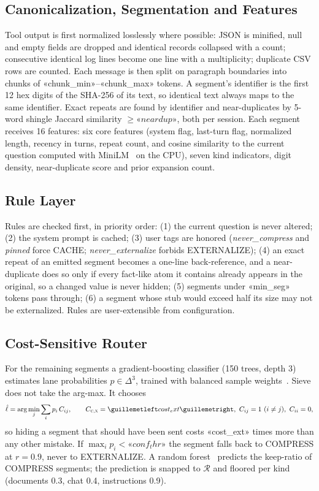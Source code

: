 \documentclass[journal]{IEEEtran}
\begin{document}
\subsection{Canonicalization, Segmentation and Features}
Tool output is first normalized losslessly where possible: JSON is minified, null and empty fields are dropped and identical records
collapsed with a count; consecutive identical log lines become one line with a multiplicity; duplicate CSV rows are counted. Each
message is then split on paragraph boundaries into chunks of «chunk_min»--«chunk_max» tokens. A segment's identifier is the first
12 hex digits of the SHA-256 of its text, so identical text always maps to the same identifier. Exact repeats are found by
identifier and near-duplicates by 5-word shingle Jaccard similarity $\ge «neardup»$, both per session. Each segment receives 16
features: six core features (system flag, last-turn flag, normalized length, recency in turns, repeat count, and cosine similarity
to the current question computed with MiniLM~\cite{wang2020minilm} on the CPU), seven kind indicators, digit density,
near-duplicate score and prior expansion count.

\subsection{Rule Layer}
Rules are checked first, in priority order: (1) the current question is never altered; (2) the system prompt is cached; (3) user
tags are honored (\textit{never\_compress} and \textit{pinned} force CACHE; \textit{never\_externalize} forbids EXTERNALIZE); (4) an
exact repeat of an emitted segment becomes a one-line back-reference, and a near-duplicate does so only if every fact-like atom it
contains already appears in the original, so a changed value is never hidden; (5) segments under «min_seg» tokens pass through;
(6) a segment whose stub would exceed half its size may not be externalized. Rules are user-extensible from configuration.

\subsection{Cost-Sensitive Router}
For the remaining segments a gradient-boosting classifier (150 trees, depth 3)~\cite{friedman2001gbm} estimates lane probabilities
$p\in\Delta^3$, trained with balanced sample weights~\cite{he2009imbalanced}. Sieve does not take the arg-max. It chooses
\begin{equation}
\hat\ell=\arg\min_{j}\sum_{i} p_i\,C_{ij},\qquad C_{\textsc{c},\textsc{x}}=«cost_ext»,\ C_{ij}=1\ (i\ne j),\ C_{ii}=0,
\label{eq:cost}
\end{equation}
so hiding a segment that should have been sent costs «cost_ext» times more than any other mistake. If $\max_i p_i<«conf_thr»$
the segment falls back to COMPRESS at $r=0.9$, never to EXTERNALIZE. A random forest~\cite{breiman2001rf} predicts the keep-ratio
of COMPRESS segments; the prediction is snapped to $\mathcal{R}$ and floored per kind (documents 0.3, chat 0.4, instructions 0.9).
\end{document}
